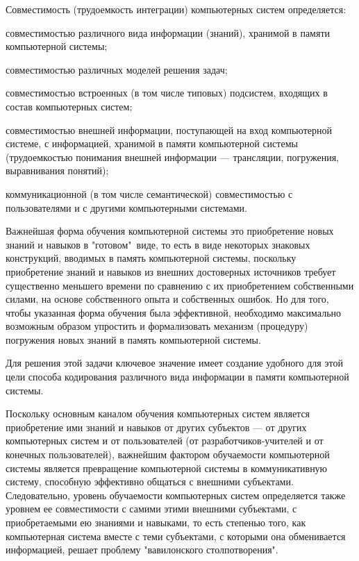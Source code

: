 Совместимость (трудоемкость интеграции) компьютерных систем определяется:
\begin{textitemize}
	\item совместимостью различного вида информации (знаний), хранимой в памяти компьютерной системы;
	\item совместимостью различных моделей решения задач;
	\item совместимостью встроенных (в том числе типовых) подсистем, входящих в состав компьютерных систем;
	\item совместимостью внешней информации, поступающей на вход компьютерной системе, с информацией, хранимой в памяти компьютерной системы (трудоемкостью понимания внешней информации --- трансляции, погружения, выравнивания понятий);
	\item коммуникационной (в том числе семантической) совместимостью с пользователями и с другими компьютерными системами.
\end{textitemize}

Важнейшая форма обучения компьютерной системы это приобретение новых знаний и навыков в "готовом"\ виде, то есть в виде некоторых знаковых конструкций, вводимых в память компьютерной системы, поскольку приобретение знаний и навыков из внешних достоверных источников требует существенно меньшего времени по сравнению с их приобретением собственными силами, на основе собственного опыта и собственных ошибок. Но для того, чтобы указанная форма обучения была эффективной, необходимо максимально возможным образом упростить и формализовать механизм (процедуру) погружения новых знаний в память компьютерной системы.

Для решения этой задачи ключевое значение имеет создание удобного для этой цели способа кодирования различного вида информации в памяти компьютерной системы.

Поскольку основным каналом обучения компьютерных систем является приобретение ими знаний и навыков от других субъектов --- от других компьютерных систем и от пользователей (от разработчиков-учителей и от конечных пользователей), важнейшим фактором обучаемости компьютерной системы является превращение компьютерной системы в коммуникативную систему, способную эффективно общаться с внешними субъектами. Следовательно, уровень обучаемости компьютерных систем определяется также уровнем ее совместимости с самими этими внешними субъектами, с приобретаемыми ею знаниями и навыками, то есть степенью того, как компьютерная система вместе с теми субъектами, с которыми она обменивается информацией, решает проблему "вавилонского столпотворения"{}.

% 